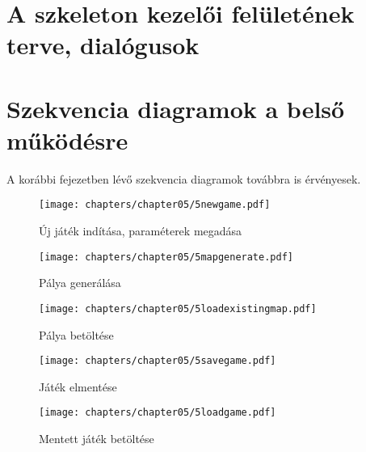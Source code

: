 \section{A szkeleton kezelői felületének terve, dialógusok}

\clearpage
\section{Szekvencia diagramok a belső működésre}

A korábbi fejezetben lévő szekvencia diagramok továbbra is érvényesek.

\begin{figure}[h]
	\begin{center}
		\texttt{[image: chapters/chapter05/5newgame.pdf]}
		\caption{Új játék indítása, paraméterek megadása}
		\label{fig:5newgame}
	\end{center}
\end{figure}

\begin{figure}[h]
	\begin{center}
		\texttt{[image: chapters/chapter05/5mapgenerate.pdf]}
		\caption{Pálya generálása}
		\label{fig:5mapgenerate}
	\end{center}
\end{figure}

\begin{figure}[h]
	\begin{center}
		\texttt{[image: chapters/chapter05/5loadexistingmap.pdf]}
		\caption{Pálya betöltése}
		\label{fig:5loadexistingmap}
	\end{center}
\end{figure}

\begin{figure}[h]
	\begin{center}
		\texttt{[image: chapters/chapter05/5savegame.pdf]}
		\caption{Játék elmentése}
		\label{fig:5savegame}
	\end{center}
\end{figure}

\begin{figure}[h]
	\begin{center}
		\texttt{[image: chapters/chapter05/5loadgame.pdf]}
		\caption{Mentett játék betöltése}
		\label{fig:5loadgame}
	\end{center}
\end{figure}

